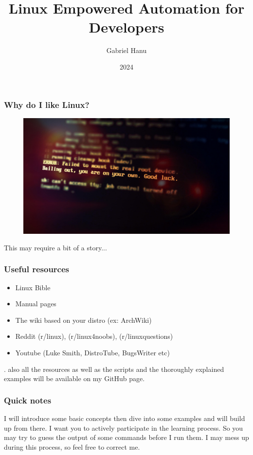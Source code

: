 \documentclass{beamer}
\title{Linux Empowered Automation for Developers}
\author{Gabriel Hanu}
\institute{UBB - Mathematics and Computer Science}
\date{2024}
\begin{document}
\frame{\titlepage}

\begin{frame}

\frametitle{Why do I like Linux? }

    \begin{figure}

        \includegraphics[width=0.8\linewidth]{whyilikelinux}

        \label{fig:whyilikelinux}

    \end{figure}
    \centering \small This may require a bit of a story...
\end{frame}

\begin{frame}

\frametitle{Useful resources}
\begin{itemize}
    \item Linux Bible
    \item Manual pages
    \item The wiki based on your distro (ex: ArchWiki)
    \item Reddit (r/linux), (r/linux4noobs), (r/linuxquestions)
    \item Youtube (Luke Smith, DistroTube, BugsWriter etc)
\end{itemize}

\small

.
\newline
also all the resources as well as the scripts and the thoroughly explained examples
will be available on my GitHub page.

\end{frame}

\begin{frame}
\frametitle{Quick notes}
\small I will introduce some basic concepts then dive into some examples and
will build up from there.
    \newline \newline
I want you to actively participate in the learning process. So you may try to guess
the output of some commands before I run them.
    \newline \newline
I may mess up during this process, so feel free to correct me.

\end{frame}
\end{document}
